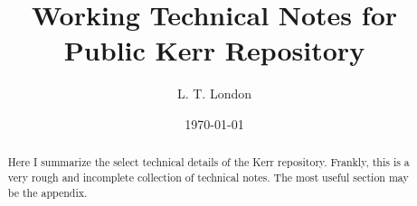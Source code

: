 \documentclass[twocolumn,prd,floatfix,preprintnumbers,a4paper,nofootinbib,superscriptaddress]{revtex4-1}
\begin{document}

\title{Working Technical Notes for Public Kerr Repository }

\author{L. T. London}

\begin{abstract}
	Here I summarize the select technical details of the Kerr repository. Frankly, this is a very rough and incomplete collection of technical notes. The most useful section may be the appendix.
\end{abstract}

\date{\today}

\maketitle
\end{document}
